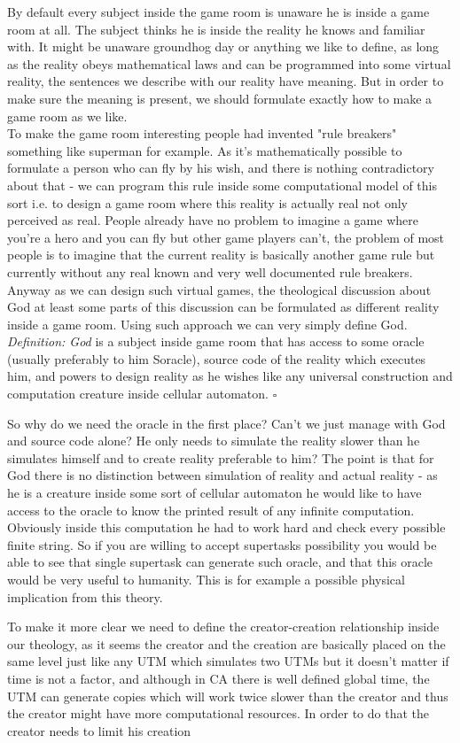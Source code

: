 \documentclass{article}
\begin{document}
By default every subject inside the game room is unaware he is inside a game room at all. The subject thinks he is inside the reality he knows and familiar with. It might be unaware groundhog day or anything we like to define, as long as the reality obeys mathematical laws and can be programmed into some virtual reality, the sentences we describe with our reality have meaning. But in order to make sure the meaning is present, we should formulate exactly how to make a game room as we like. \\

To make the game room interesting people had invented "rule breakers" something like superman for example. As it's mathematically possible to formulate a person who can fly by his wish, and there is nothing contradictory about that - we can program this rule inside some computational model of this sort i.e. to design a game room where this reality is actually real not only perceived as real. People already have no problem to imagine a game where you're a hero and you can fly but other game players can't, the problem of most people is to imagine that the current reality is basically another game rule but currently without any real known and very well documented rule breakers. Anyway as we can design such virtual games, the theological discussion about God at least some parts of this discussion can be formulated as different reality inside a game room. Using such approach we can very simply define God. \\

\textit{Definition: God} is a subject inside game room that has access to some oracle (usually preferably to him Soracle), source code of the reality which executes him, and powers to design reality as he wishes like any universal construction and computation creature inside cellular automaton. $\square$

So why do we need the oracle in the first place? Can't we just manage with God and source code alone? He only needs to simulate the reality slower than he simulates himself and to create reality preferable to him? The point is that for God there is no distinction between simulation of reality and actual reality - as he is a creature inside some sort of cellular automaton he would like to have access to the oracle to know the printed result of any infinite computation. Obviously inside this computation he had to work hard and check every possible finite string. So if you are willing to accept supertasks possibility you would be able to see that single supertask can generate such oracle, and that this oracle would be very useful to humanity. This is for example a possible physical implication from this theory. 

To make it more clear we need to define the creator-creation relationship inside our theology, as it seems the creator and the creation are basically placed on the same level just like any UTM which simulates two UTMs but it doesn't matter if time is not a factor, and although in CA there is well defined global time, the UTM can generate copies which will work twice slower than the creator and thus the creator might have more computational resources. In order to do that the creator needs to limit his creation 
\end{document}
